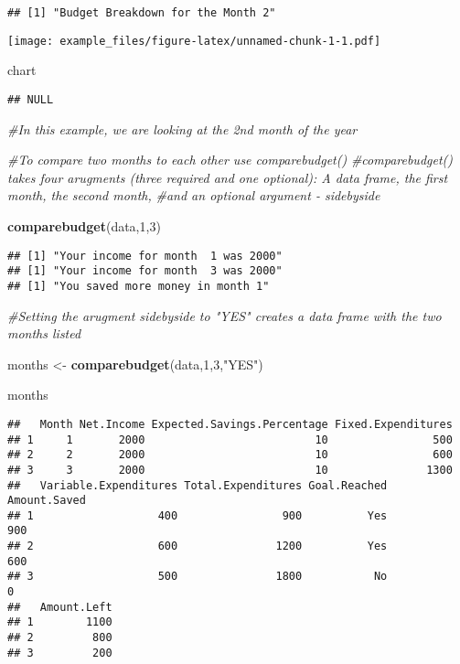\documentclass[
]{article}
\newenvironment{Shaded}{\begin{snugshade}}{\end{snugshade}}
\newcommand{\CommentTok}[1]{\textcolor[rgb]{0.56,0.35,0.01}{\textit{#1}}}
\newcommand{\DecValTok}[1]{\textcolor[rgb]{0.00,0.00,0.81}{#1}}
\newcommand{\KeywordTok}[1]{\textcolor[rgb]{0.13,0.29,0.53}{\textbf{#1}}}
\newcommand{\NormalTok}[1]{#1}
\newcommand{\StringTok}[1]{\textcolor[rgb]{0.31,0.60,0.02}{#1}}
\begin{document}
\begin{verbatim}
## [1] "Budget Breakdown for the Month 2"
\end{verbatim}

\texttt{[image: example\_files/figure-latex/unnamed-chunk-1-1.pdf]}

\begin{Shaded}
\begin{Highlighting}[]
\NormalTok{chart}
\end{Highlighting}
\end{Shaded}

\begin{verbatim}
## NULL
\end{verbatim}

\begin{Shaded}
\begin{Highlighting}[]
\CommentTok{#In this example, we are looking at the 2nd month of the year}


\CommentTok{#To compare two months to each other use comparebudget()}
\CommentTok{#comparebudget() takes four arugments (three required and one optional): A data frame, the first month, the second month,}
\CommentTok{#and an optional argument - sidebyside}

\KeywordTok{comparebudget}\NormalTok{(data,}\DecValTok{1}\NormalTok{,}\DecValTok{3}\NormalTok{)}
\end{Highlighting}
\end{Shaded}

\begin{verbatim}
## [1] "Your income for month  1 was 2000"
## [1] "Your income for month  3 was 2000"
## [1] "You saved more money in month 1"
\end{verbatim}

\begin{Shaded}
\begin{Highlighting}[]
\CommentTok{#Setting the arugment sidebyside to "YES" creates a data frame with the two months listed}


\NormalTok{months <-}\StringTok{ }\KeywordTok{comparebudget}\NormalTok{(data,}\DecValTok{1}\NormalTok{,}\DecValTok{3}\NormalTok{,}\StringTok{"YES"}\NormalTok{)}

\NormalTok{months}
\end{Highlighting}
\end{Shaded}

\begin{verbatim}
##   Month Net.Income Expected.Savings.Percentage Fixed.Expenditures
## 1     1       2000                          10                500
## 2     2       2000                          10                600
## 3     3       2000                          10               1300
##   Variable.Expenditures Total.Expenditures Goal.Reached Amount.Saved
## 1                   400                900          Yes          900
## 2                   600               1200          Yes          600
## 3                   500               1800           No            0
##   Amount.Left
## 1        1100
## 2         800
## 3         200
\end{verbatim}
\end{document}
